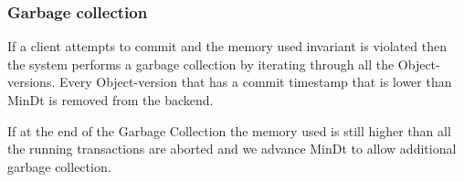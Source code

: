 \documentclass[systeme,french,english]{compas2022}
\begin{document}


\subsubsection{Garbage collection}

If a client attempts to commit and the memory used invariant is violated then the system performs a garbage collection by iterating through all the Object-versions.
Every Object-version that has a commit timestamp that is lower than MinDt is removed from the backend.

If at the end of the Garbage Collection the memory used is still higher than all the running transactions are aborted and we advance MinDt to allow additional garbage collection.
\end{document}

